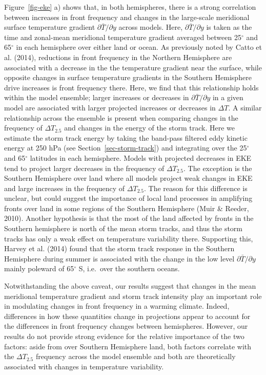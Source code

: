 \documentclass[
]{agujournal2019}
\begin{document}
Figure~\ref{fig-eke} a) shows that, in both hemispheres, there is a
strong correlation between increases in front frequency and changes in
the large-scale meridional surface temperature gradient
\(\partial \bar{T} / \partial y\) across models. Here,
\(\partial \bar{T} / \partial y\) is taken as the time and zonal-mean
meridional temperature gradient averaged between 25\(^{\circ}\) and
65\(^{\circ}\) in each hemisphere over either land or ocean. As
previously noted by Catto et al. (2014), reductions in front frequency
in the Northern Hemisphere are associated with a decrease in the the
temperature gradient near the surface, while opposite changes in surface
temperature gradients in the Southern Hemisphere drive increases is
front frequency there. Here, we find that this relationship holds within
the model ensemble; larger increases or decreases in
\(\partial \bar{T} / \partial y\) in a given model are associated with
larger projected increases or decreases in \(\Delta T\). A similar
relationship across the ensemble is present when comparing changes in
the frequency of \(\Delta T_{2.5}\) and changes in the energy of the
storm track. Here we estimate the storm track energy by taking the
band-pass filtered eddy kinetic energy at 250 hPa (see
Section~\ref{sec-storm-track}) and integrating over the 25\(^{\circ}\)
and 65\(^{\circ}\) latitudes in each hemisphere. Models with projected
decreases in EKE tend to project larger decreases in the frequency of
\(\Delta T_{2.5}\). The exception is the Southern Hemisphere over land
where all models project weak changes in EKE and large increases in the
frequency of \(\Delta T_{2.5}\). The reason for this difference is
unclear, but could suggest the importance of local land processes in
amplifying fronts over land in some regions of the Southern Hemisphere
(Muir \& Reeder, 2010). Another hypothesis is that the most of the land
affected by fronts in the Southern hemisphere is north of the mean storm
tracks, and thus the storm tracks has only a weak effect on temperature
variability there. Supporting this, Harvey et al. (2014) found that the
storm track response in the Southern Hemisphere during summer is
associated with the change in the low level
\(\partial \bar{T} / \partial y\) mainly poleward of 65\(^{\circ}\) S,
i.e.~over the southern oceans.

Notwithstanding the above caveat, our results suggest that changes in
the mean meridional temperature gradient and storm track intensity play
an important role in modulating changes in front frequency in a warming
climate. Indeed, differences in how these quantities change in
projections appear to account for the differences in front frequency
changes between hemispheres. However, our results do not provide strong
evidence for the relative importance of the two factors: aside from over
Southern Hemisphere land, both factors correlate with the
\(\Delta T_{2.5}\) frequency across the model ensemble and both are
theoretically associated with changes in temperature variability.
\end{document}
